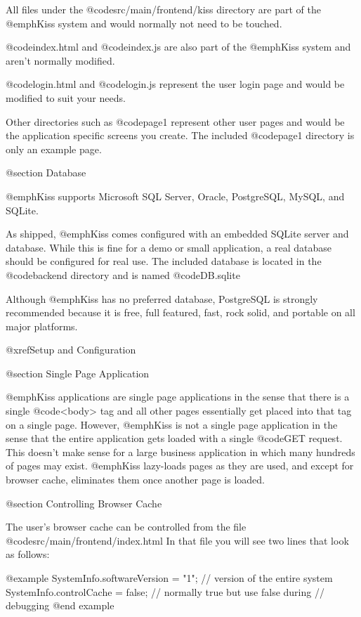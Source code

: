 All files under the @code{src/main/frontend/kiss} directory are part of
the @emph{Kiss} system and would normally not need to be touched.

@code{index.html} and @code{index.js} are also part of the @emph{Kiss}
system and aren't normally modified.

@code{login.html} and @code{login.js} represent the user login page
and would be modified to suit your needs.

Other directories such as @code{page1} represent other user pages and
would be the application specific screens you create.  The included
@code{page1} directory is only an example page.

@section Database

@emph{Kiss} supports Microsoft SQL Server, Oracle, PostgreSQL, MySQL, and
SQLite.

As shipped, @emph{Kiss} comes configured with an embedded SQLite
server and database.  While this is fine for a demo or small
application, a real database should be configured for real use.
The included database is located in the @code{backend} directory
and is named @code{DB.sqlite}

Although @emph{Kiss} has no preferred database, PostgreSQL is strongly
recommended because it is free, full featured, fast, rock solid, and
portable on all major platforms.

@xref{Setup and Configuration}


@section Single Page Application

@emph{Kiss} applications are single page applications in the sense
that there is a single @code{<body>} tag and all other pages
essentially get placed into that tag on a single page.  However,
@emph{Kiss} is not a single page application in the sense that the
entire application gets loaded with a single @code{GET} request.  This
doesn't make sense for a large business application in which many
hundreds of pages may exist.  @emph{Kiss} lazy-loads pages as they are
used, and except for browser cache, eliminates them once another page
is loaded.

@section Controlling Browser Cache

The user's browser cache can be controlled from the file
@code{src/main/frontend/index.html} In that file you will see two lines
that look as follows:

@example
SystemInfo.softwareVersion = "1";  // version of the entire system
SystemInfo.controlCache = false;   // normally true but use false during
                            // debugging
@end example

